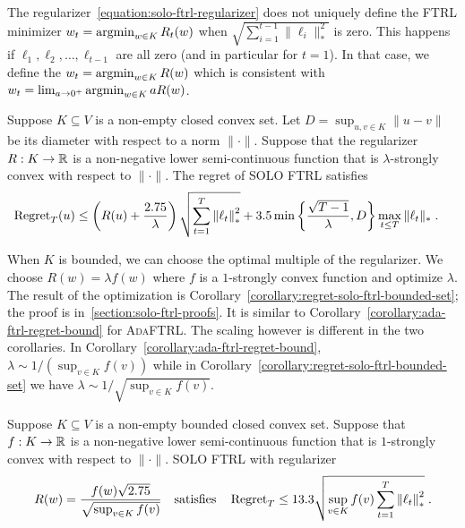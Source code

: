 The regularizer~\eqref{equation:solo-ftrl-regularizer} does not uniquely define
the \textsc{FTRL} minimizer $w_t = \operatorname*{argmin}_{w \in K} R_t(w)$ when
$\sqrt{\sum_{i=1}^{t-1} \|\ell_i\|_*^2}$ is zero. This happens if $\ell_1,
\ell_2, \dots, \ell_{t-1}$ are all zero (and in particular for $t=1$).  In that
case, we define the $w_t = \operatorname*{argmin}_{w \in K} R(w)$ which is consistent with
$w_t = \lim_{a \to 0^+}  \operatorname*{argmin}_{w \in K} a R(w)$.

\begin{theorem}
\label{theorem:regret-solo-ftrl}
Suppose $K \subseteq V$ is a non-empty closed convex set.  Let $D = \sup_{u,v
\in K} \|u - v\|$ be its diameter with respect to a norm $\|\cdot\|$.  Suppose
that the regularizer $R:K \to \mathbb{R}$ is a non-negative lower semi-continuous
function that is $\lambda$-strongly convex with respect to $\|\cdot\|$. The
regret of \textsc{SOLO FTRL} satisfies
\begin{align*}
\operatorname{Regret}_T(u)
& \le \left( R(u) + \frac{2.75}{\lambda}\right) \sqrt{\sum_{t=1}^{T} {\left\|{\ell_t}\right\|}_*^2}
+ 3.5 \min\left\{\frac{\sqrt{T-1}}{\lambda} , D\right\} \max_{t \le T} \|\ell_t\|_* \; .
\end{align*}
\end{theorem}

When $K$ is bounded, we can choose the optimal multiple of the regularizer.  We
choose $R(w) = \lambda f(w)$ where $f$ is a $1$-strongly convex function and
optimize $\lambda$.  The result of the optimization is
Corollary~\ref{corollary:regret-solo-ftrl-bounded-set}; the proof is
in~\ref{section:solo-ftrl-proofs}.  It is similar to
Corollary~\ref{corollary:ada-ftrl-regret-bound} for \textsc{AdaFTRL}. The
scaling however is different in the two corollaries.  In
Corollary~\ref{corollary:ada-ftrl-regret-bound}, $\lambda \sim 1/(\sup_{v \in
K} f(v))$ while in Corollary~\ref{corollary:regret-solo-ftrl-bounded-set} we
have $\lambda \sim 1/\sqrt{\sup_{v \in K} f(v)}$.

\begin{corollary}
\label{corollary:regret-solo-ftrl-bounded-set}
Suppose $K \subseteq V$ is a non-empty bounded closed convex set.  Suppose that
$f:K \to \mathbb{R}$ is a non-negative lower semi-continuous function that is
$1$-strongly convex with respect to $\|\cdot\|$. \textsc{SOLO FTRL} with
regularizer
$$
R(w) = \frac{f(w)\sqrt{2.75}}{\sqrt{\sup_{v \in K} f(v)}}
\quad \text{satisfies} \quad
\operatorname{Regret}_T \le 13.3 \sqrt{\sup_{v \in K} f(v) \sum_{t=1}^{T} {\left\|{\ell_t}\right\|}_*^2} \; .
$$
\end{corollary}

